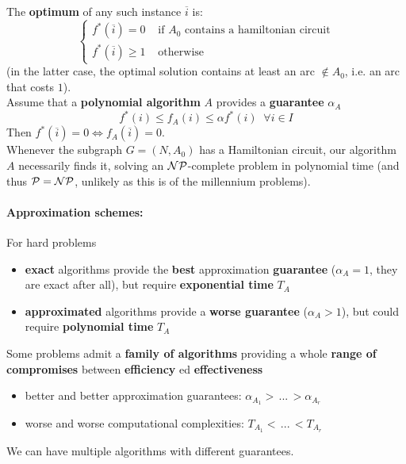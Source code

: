 The \textbf{optimum} of any such instance $\overline{i}$ is:
\begin{displaymath}
	\begin{cases}
		f^\ast (\overline{i}) = 0 & \text{ if } A_0 \text{ contains a hamiltonian circuit} \\
		f^\ast (\overline{i}) \geq 1 & \text{ otherwise}
	\end{cases}
\end{displaymath}
(in the latter case, the optimal solution contains at least an arc $\notin A_0$, i.e. an arc that costs $1$).\\

Assume that a \textbf{polynomial algorithm} $A$ provides a \textbf{guarantee} $\alpha_A$
$$ f^\ast (i) \leq f_A (i) \leq \alpha f^\ast (i) \;\; \forall i \in I $$
Then $f^\ast (\overline{i}) = 0 \Leftrightarrow f_A (\overline{i}) = 0$.\\

Whenever the subgraph $G = (N, A_0)$ has a Hamiltonian circuit, our algorithm $A$ necessarily finds it, solving an $\mathcal{NP}$-complete problem in polynomial time (and thus $\mathcal{P} = \mathcal{NP}$, unlikely as this is of the millennium problems).\\

\newpage

\paragraph{Approximation schemes:} For hard problems
\begin{itemize}
	\item \textbf{exact} algorithms provide the \textbf{best} approximation \textbf{guarantee} ($\alpha_A = 1$, they are exact after all), but require \textbf{exponential time} $T_A$
	\item \textbf{approximated} algorithms provide a \textbf{worse guarantee} ($\alpha_A > 1$), but could require \textbf{polynomial time} $T_A$
\end{itemize}

Some problems admit a \textbf{family of algorithms} providing a whole \textbf{range of compromises} between \textbf{efficiency} ed \textbf{effectiveness}
\begin{itemize}
	\item better and better approximation guarantees: $\alpha_{A_1} > \, ... \, > \alpha_{A_r}$
	\item worse and worse computational complexities: $T_{A_1} < \, ... \, < T_{A_r}$
\end{itemize}
We can have multiple algorithms with different guarantees.\\

